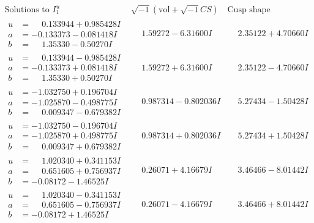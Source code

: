 \documentclass[1p]{elsarticle_modified}
\theoremstyle{definition}
\newcommand{\I}{\sqrt{-1}}
\begin{document}
$$\begin{array}{c|c|c}  
\text{Solutions to }I^u_{1}& \I (\text{vol} + \sqrt{-1}CS) & \text{Cusp shape}\\
 \hline 
\begin{aligned}
u &= \phantom{-}0.133944 + 0.985428 I \\
a &= -0.133373 - 0.081418 I \\
b &= \phantom{-}1.35330 - 0.50270 I\end{aligned}
 & \phantom{-}1.59272 - 6.31600 I & \phantom{-}2.35122 + 4.70660 I \\ \hline\begin{aligned}
u &= \phantom{-}0.133944 - 0.985428 I \\
a &= -0.133373 + 0.081418 I \\
b &= \phantom{-}1.35330 + 0.50270 I\end{aligned}
 & \phantom{-}1.59272 + 6.31600 I & \phantom{-}2.35122 - 4.70660 I \\ \hline\begin{aligned}
u &= -1.032750 + 0.196704 I \\
a &= -1.025870 - 0.498775 I \\
b &= \phantom{-}0.009347 - 0.679382 I\end{aligned}
 & \phantom{-}0.987314 - 0.802036 I & \phantom{-}5.27434 - 1.50428 I \\ \hline\begin{aligned}
u &= -1.032750 - 0.196704 I \\
a &= -1.025870 + 0.498775 I \\
b &= \phantom{-}0.009347 + 0.679382 I\end{aligned}
 & \phantom{-}0.987314 + 0.802036 I & \phantom{-}5.27434 + 1.50428 I \\ \hline\begin{aligned}
u &= \phantom{-}1.020340 + 0.341153 I \\
a &= \phantom{-}0.651605 + 0.756937 I \\
b &= -0.08172 - 1.46525 I\end{aligned}
 & \phantom{-}0.26071 + 4.16679 I & \phantom{-}3.46466 - 8.01442 I \\ \hline\begin{aligned}
u &= \phantom{-}1.020340 - 0.341153 I \\
a &= \phantom{-}0.651605 - 0.756937 I \\
b &= -0.08172 + 1.46525 I\end{aligned}
 & \phantom{-}0.26071 - 4.16679 I & \phantom{-}3.46466 + 8.01442 I \\ \hline\begin{aligned}

\end{aligned}
\end{array}$$
\end{document}
